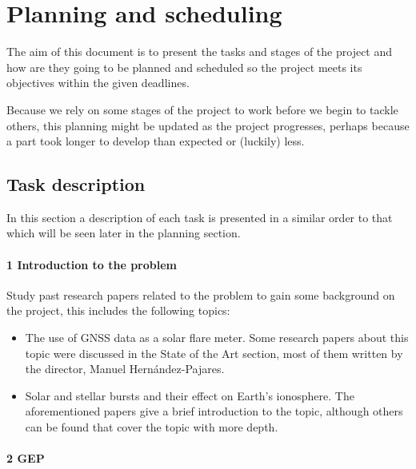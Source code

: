 \section{Planning and scheduling}

The aim of this document is to present the tasks and stages of the project and how are they going to be planned and scheduled so the project meets its objectives within the given deadlines.

Because we rely on some stages of the project to work before we begin to tackle others, this planning might be updated as the project progresses, perhaps because a part took longer to develop than expected or (luckily) less.

\subsection{Task description}

In this section a description of each task is presented in a similar order to that which will be seen later in the planning section.

\paragraph{1 Introduction to the problem}

Study past research papers related to the problem to gain some background on the project, this includes the following topics:

\begin{itemize}
  \item The use of GNSS data as a solar flare meter. Some research papers about this topic were discussed in the State of the Art section, most of them written by the director, Manuel Hernández-Pajares. \cite{hernandez2012gnss}
  \item Solar and stellar bursts and their effect on Earth’s ionosphere. The aforementioned papers give a brief introduction to the topic, although others can be found that cover the topic with more depth. \cite{mitra1974ionospheric}
\end{itemize}

\paragraph{2 GEP}

